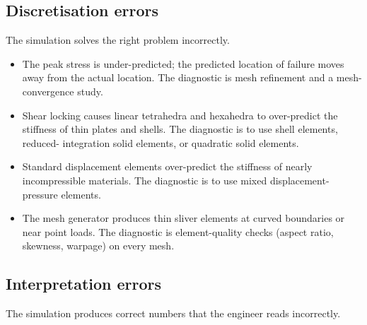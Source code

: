 \subsection{Discretisation errors}

The simulation solves the right problem incorrectly.

\begin{itemize}[leftmargin=*]
  \item {} The peak
    stress is under-predicted; the predicted location of failure
    moves away from the actual location. The diagnostic is mesh
    refinement and a mesh-convergence study.
  \item {} Shear locking causes linear tetrahedra and
    hexahedra to over-predict the stiffness of thin plates and
    shells. The diagnostic is to use shell elements, reduced-
    integration solid elements, or quadratic solid elements.
  \item {} Standard displacement elements over-predict the
    stiffness of nearly incompressible materials. The diagnostic
    is to use mixed displacement-pressure elements.
  \item {} The mesh generator produces thin sliver
    elements at curved boundaries or near point loads. The
    diagnostic is element-quality checks (aspect ratio,
    skewness, warpage) on every mesh.
\end{itemize}

\subsection{Interpretation errors}

The simulation produces correct numbers that the engineer reads
incorrectly.

